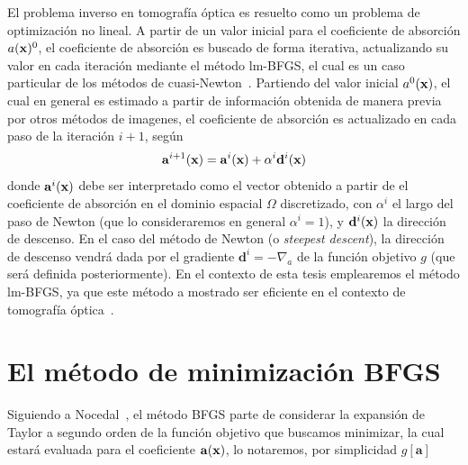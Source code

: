 El problema inverso en tomografía óptica es resuelto como un problema de optimización 
no lineal. A partir de un valor inicial para el coeficiente de absorción $a(\mathbf{x})^0$, 
el coeficiente de absorción es buscado de forma iterativa, actualizando su valor 
en cada iteración mediante el método lm-BFGS, el cual es un caso particular 
de los métodos de cuasi-Newton~\cite{Nocedal2006,Klose2003QN,Ren2006}. 
Partiendo del valor inicial $a^0(\mathbf{x})$, el cual en general es estimado 
a partir de información obtenida de manera previa por otros métodos de imagenes, 
el coeficiente de absorción es 
\clearpage
\noindent actualizado en cada paso de la iteración $i+1$, según~\cite{Klose2003QN}
\begin{equation}
\mathbf{a}^{i+1}(\mathbf{x})=\mathbf{a}^{i}(\mathbf{x})+\alpha^i  \mathbf{d}^i(\mathbf{x})
\label{eq:update}
\end{equation}
donde $\mathbf{a}^{i}(\mathbf{x})$ debe ser interpretado como el 
vector obtenido a partir de el coeficiente de absorción en el 
dominio espacial $\Omega$  
discretizado, con $\alpha^i$ el largo del paso de Newton (que lo consideraremos 
en general $\alpha^i=1$), y $\mathbf{d}^i(\mathbf{x})$ 
la dirección de descenso. En el caso del método de Newton (o {\em steepest descent}), la dirección de 
descenso vendrá dada por el gradiente $\mathbf{d}^i=-\nabla_a $ de la función objetivo $g$ (que será definida posteriormente). 
En el contexto de esta tesis emplearemos el método lm-BFGS, ya que este método a 
mostrado ser eficiente en el contexto de tomografía óptica~\cite{Klose2003QN,Ren2006,
Prieto2017}. 

\section{El método de minimización BFGS}
\label{sec:BFGS}
Siguiendo a Nocedal~\cite{Nocedal2006}, el método BFGS parte de considerar la expansión de Taylor a segundo orden de la función objetivo 
que buscamos minimizar, la cual estará evaluada para el coeficiente $\mathbf{a}(\mathbf{x})$,  
lo notaremos, por simplicidad  $g[\mathbf{a}]$


